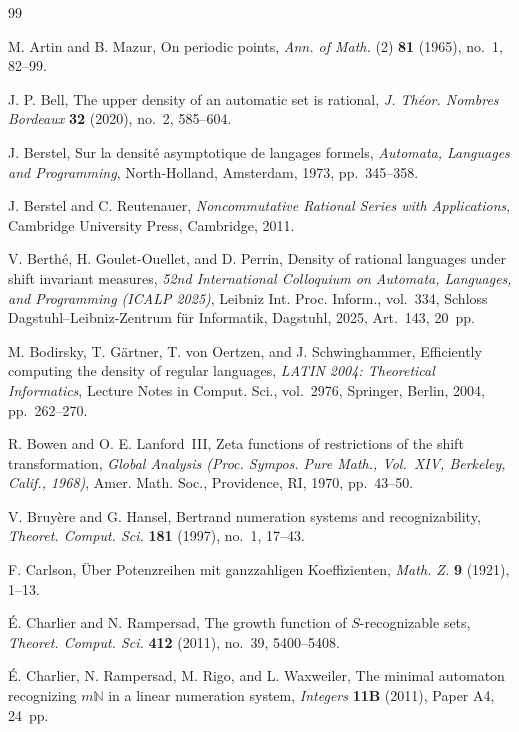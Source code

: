 \documentclass[11pt,a4paper]{amsart}
\theoremstyle{plain}
\theoremstyle{definition}
\theoremstyle{remark}
\begin{document}
\begin{thebibliography}{99}

M. Artin and B. Mazur,
On periodic points,
\textit{Ann. of Math.} (2) \textbf{81} (1965), no.~1, 82--99.

J. P. Bell,
The upper density of an automatic set is rational,
\textit{J. Th{\'e}or. Nombres Bordeaux} \textbf{32} (2020), no.~2, 585--604.

J. Berstel,
Sur la densit\'e asymptotique de langages formels,
\textit{Automata, Languages and Programming},
North-Holland, Amsterdam, 1973, pp.~345--358.

J. Berstel and C. Reutenauer,
\textit{Noncommutative Rational Series with Applications},
Cambridge University Press, Cambridge, 2011.

V. Berth{\'e}, H. Goulet-Ouellet, and D. Perrin,
Density of rational languages under shift invariant measures,
\textit{52nd International Colloquium on Automata, Languages, and Programming
(ICALP 2025)}, Leibniz Int. Proc. Inform., vol.~334,
Schloss Dagstuhl--Leibniz-Zentrum f\"ur Informatik, Dagstuhl, 2025,
Art.~143, 20~pp.

M. Bodirsky, T. G\"artner, T. von Oertzen, and J. Schwinghammer,
Efficiently computing the density of regular languages,
\textit{LATIN 2004: Theoretical Informatics}, Lecture Notes in Comput.
Sci., vol.~2976, Springer, Berlin, 2004, pp.~262--270.

R. Bowen and O. E. Lanford~III,
Zeta functions of restrictions of the shift transformation,
\textit{Global Analysis (Proc. Sympos. Pure Math., Vol.~XIV, Berkeley,
Calif., 1968)}, Amer. Math. Soc., Providence, RI, 1970, pp.~43--50.

V. Bruy{\`e}re and G. Hansel,
Bertrand numeration systems and recognizability,
\textit{Theoret. Comput. Sci.} \textbf{181} (1997), no.~1, 17--43.

F. Carlson,
{\"U}ber Potenzreihen mit ganzzahligen Koeffizienten,
\textit{Math. Z.} \textbf{9} (1921), 1--13.

\'E. Charlier and N. Rampersad,
The growth function of \(S\)-recognizable sets,
\textit{Theoret. Comput. Sci.} \textbf{412} (2011), no.~39, 5400--5408.

\'E. Charlier, N. Rampersad, M. Rigo, and L. Waxweiler,
The minimal automaton recognizing \(m\mathbb{N}\) in a linear numeration
system,
\textit{Integers} \textbf{11B} (2011), Paper A4, 24~pp.


\end{thebibliography}
\end{document}
